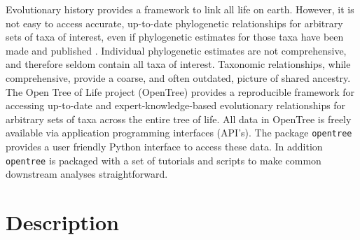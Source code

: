 \documentclass[oupdraft]{sysbio_sse}
\begin{document}
Evolutionary history provides a framework to link all life on earth. However, it is not easy to access accurate, up-to-date phylogenetic relationships for arbitrary sets of taxa of interest, even if phylogenetic estimates for those taxa have been made and published \citep{drew_lost_2013, mctavish_how_2017}. Individual phylogenetic estimates are not comprehensive, and therefore seldom contain all taxa of interest. Taxonomic relationships, while comprehensive, provide a coarse, and often outdated, picture of shared ancestry.
The Open Tree of Life project (OpenTree) provides a reproducible framework for accessing up-to-date and expert-knowledge-based evolutionary relationships for arbitrary sets of taxa across the entire tree of life.
All data in OpenTree is freely available via application programming interfaces (API's).
The package \texttt{opentree} provides a user friendly Python interface to access these data. In addition \texttt{opentree} is packaged with a set of tutorials and scripts to make common downstream analyses straightforward.

\bigskip
\section{Description}
\label{sec2}
\end{document}
